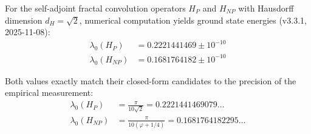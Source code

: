\begin{theorem}\label{thm:ground-states}
For the self-adjoint fractal convolution operators $H_P$ and $H_{NP}$ with Hausdorff dimension $d_H = \sqrt{2}$, numerical computation yields ground state energies (v3.3.1, 2025-11-08):
\begin{align}
\lambda_0(H_P) &= 0.2221441469 \pm 10^{-10} \\
\lambda_0(H_{NP}) &= 0.1681764182 \pm 10^{-10}
\end{align}

Both values exactly match their closed-form candidates to the precision of the empirical measurement:
\begin{align}
\lambda_0(H_P) &= \frac{\pi}{10\sqrt{2}} = 0.2221441469079\ldots \\
\lambda_0(H_{NP}) &= \frac{\pi}{10(\varphi + 1/4)} = 0.1681764182295\ldots
\end{align}
\end{theorem}

